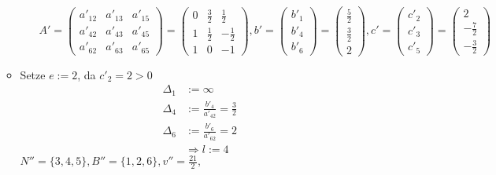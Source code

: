 \documentclass[a4paper,10pt]{article}
\begin{document}
\begin{enumerate}
\begin{itemize}
\begin{itemize}
                        \[
                        A' = \begin{pmatrix}
                                a'_{12} & a'_{13} & a'_{15} \\
                                a'_{42} & a'_{43} & a'_{45} \\
                                a'_{62} & a'_{63} & a'_{65}
                            \end{pmatrix}
                        = \begin{pmatrix}
                                0 & \frac{3}{2} & \frac{1}{2} \\
                                1 & \frac{1}{2} & -\frac{1}{2} \\
                                1 & 0           & -1
                            \end{pmatrix}, 
                        b' = \begin{pmatrix}b'_1 \\ b'_4 \\ b'_6 \end{pmatrix} 
                           = \begin{pmatrix}\frac{5}{2} \\ \frac{3}{2} \\ 2 \end{pmatrix},
                        c' = \begin{pmatrix}c'_2 \\ c'_3 \\ c'_5 \end{pmatrix} 
                           = \begin{pmatrix}2 \\ -\frac{7}{2} \\ -\frac{3}{2} \end{pmatrix}
                        \]
                \end{itemize}
        \item   Setze $e := 2$, da $c'_2 = 2 > 0$
                \begin{align*}
                    \Delta_1 &:= \infty\\
                    \Delta_4 &:= \frac{b'_4}{a'_{42}} = \frac{3}{2}\\
                    \Delta_6 &:= \frac{b'_6}{a'_{62}} = 2\\
                                &\Rightarrow l := 4
                \end{align*}
                $N'' = \{3,4,5\}, B'' = \{1,2,6\}, v'' = \frac{21}{2},$

\end{itemize}
\end{enumerate}
\end{document}

